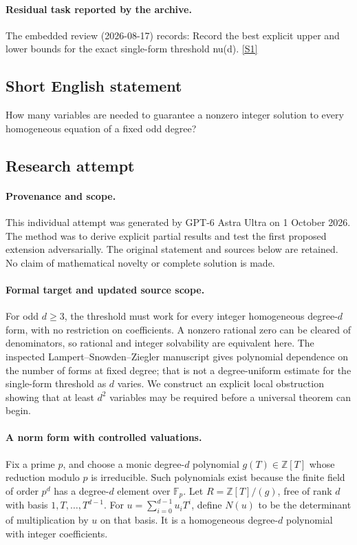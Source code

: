 \documentclass[11pt,a4paper]{article}
\newcommand{\Z}{\mathbb{Z}}
\newcommand{\F}{\mathbb{F}}
\newcommand{\sref}[2]{\hyperlink{source:#1:#2}{[S#2]}}
\begin{document}
\paragraph{Residual task reported by the archive.}

The embedded review (2026-08-17) records: Record the best explicit upper and lower bounds for the exact single-form threshold nu(d). \sref{150}{1}

\subsection{Short English statement}

How many variables are needed to guarantee a nonzero integer solution to every homogeneous equation of a fixed odd degree?

\subsection{Research attempt}

\paragraph{Provenance and scope.}
This individual attempt was generated by GPT-6 Astra Ultra on 1 October 2026. The method was to derive explicit partial results and test the first proposed extension adversarially. The original statement and sources below are retained. No claim of mathematical novelty or complete solution is made.

\paragraph{Formal target and updated source scope.}
For odd $d\geq3$, the threshold must work for every integer homogeneous degree-$d$ form, with no restriction on coefficients. A nonzero rational zero can be cleared of denominators, so rational and integer solvability are equivalent here. The inspected Lampert--Snowden--Ziegler manuscript gives polynomial dependence on the number of forms at fixed degree; that is not a degree-uniform estimate for the single-form threshold as $d$ varies. We construct an explicit local obstruction showing that at least $d^2$ variables may be required before a universal theorem can begin.

\paragraph{A norm form with controlled valuations.}
Fix a prime $p$, and choose a monic degree-$d$ polynomial $g(T)\in\Z[T]$ whose reduction modulo $p$ is irreducible. Such polynomials exist because the finite field of order $p^d$ has a degree-$d$ element over $\F_p$. Let $R=\Z[T]/(g)$, free of rank $d$ with basis $1,T,\ldots,T^{d-1}$. For $u=\sum_{i=0}^{d-1}u_iT^i$, define $N(u)$ to be the determinant of multiplication by $u$ on that basis. It is a homogeneous degree-$d$ polynomial with integer coefficients.
\end{document}
